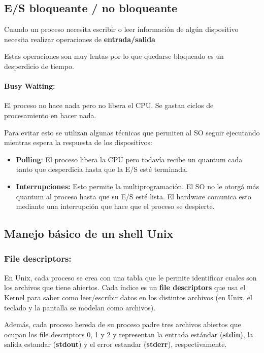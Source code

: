 \subsection{E/S bloqueante / no bloqueante}
    Cuando un proceso necesita escribir o leer información de algún dispositivo necesita realizar operaciones de \textbf{entrada/salida}

    Estas operaciones son muy lentas por lo que quedarse bloqueado es un desperdicio de tiempo.

    \paragraph{Busy Waiting:} El proceso no hace nada pero no libera el CPU. Se gastan ciclos de procesamiento en hacer nada.

    Para evitar esto se utilizan algunas técnicas que permiten al SO seguir ejecutando mientras espera la respuesta de los dispositivos:

    \begin{itemize}
        \item \textbf{Polling}: El proceso libera la CPU pero todavía recibe un quantum cada tanto que desperdicia hasta que la E/S esté terminada.
        \item \textbf{Interrupciones:} Esto permite la multiprogramación. El SO no le otorgá más quantum al proceso hasta que su E/S esté lista. El hardware comunica esto mediante una interrupción que hace que el proceso se despierte.
    \end{itemize}

    \subsection{Manejo básico de un shell Unix}
\subsubsection{File descriptors:}
    En Unix, cada proceso se crea con una tabla que le permite identificar cuales son los archivos que tiene abiertos. Cada índice es un \textbf{file descriptors} que usa el Kernel para saber como leer/escribir datos en los distintos archivos (en Unix, el teclado y la pantalla se modelan como archivos).
    
    Además, cada proceso hereda de su proceso padre tres archivos abiertos que ocupan los file descriptors 0, 1 y 2 y representan la entrada estándar (\textbf{stdin}), la salida estandar (\textbf{stdout}) y el error estandar (\textbf{stderr}), respectivamente.
    
